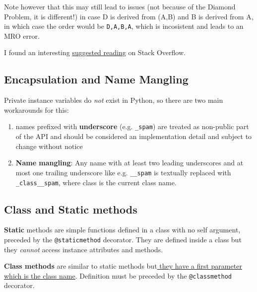 Note however that this may still lead to issues (not because of the Diamond Problem, it is different!) in case D is derived from (A,B) and B is derived from A, in which case the order would be \lstinline|D,A,B,A|, which is incosistent and leads to an MRO error.

I found an interesting \href{https://stackoverflow.com/questions/56361048/what-is-the-diamond-problem-in-python-and-why-its-not-appear-in-python2}{suggested reading}
on Stack Overflow.



\subsection{Encapsulation and Name Mangling}
Private instance variables do \textit{not} exist in Python,
so there are two main workarounds for this:
\begin{enumerate}
   \item names prefixed with \textbf{underscore} (e.g. \lstinline|_spam|) are treated as
   non-public part of the API and should be considered an implementation detail and subject to change without notice
   \item \textbf{Name mangling}:
   Any name with at least two leading underscores and at most one trailing
   underscore like e.g. \lstinline|__spam| is textually replaced with \lstinline|_class__spam|,
   where class is the current class name.
\end{enumerate}

\subsection{Class and Static methods}
\textbf{Static} methods are simple functions defined in a class with no self
argument, preceded by the \lstinline|@staticmethod| decorator.
They are defined inside a class but they \textit{cannot} access instance attributes and methods.

\textbf{Class methods} are similar to static methods but\ul{ they have a first parameter which is the class name}.
Definition must be preceded by the \lstinline|@classmethod| decorator.

